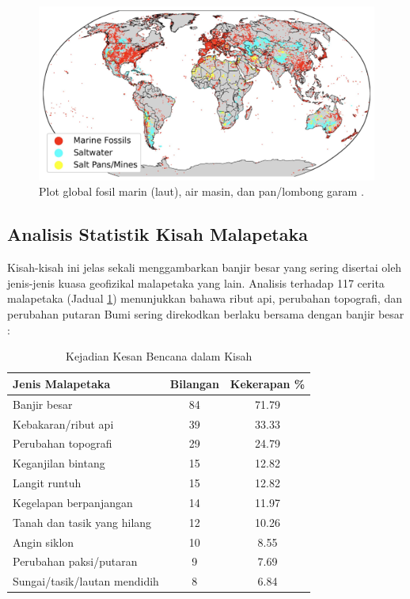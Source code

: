 \documentclass[10pt,twocolumn,letterpaper]{article}
\begin{document}
\begin{figure}[b]
\begin{center}
\includegraphics[width=1\textwidth]{marine.jpg}
\end{center}
   \caption{Plot global fosil marin (laut), air masin, dan pan/lombong garam \cite{15,16,86,87}.}
   \label{fig:2}
\end{figure}

\subsection{Analisis Statistik Kisah Malapetaka}

Kisah-kisah ini jelas sekali menggambarkan banjir besar yang sering disertai oleh jenis-jenis kuasa geofizikal malapetaka yang lain. Analisis terhadap 117 cerita malapetaka (Jadual \ref{tab: 1}) menunjukkan bahawa ribut api, perubahan topografi, dan perubahan putaran Bumi sering direkodkan berlaku bersama dengan banjir besar \cite{14}:

\begin{table}[ht]
\begin{center}
\renewcommand{\arraystretch}{1.2}  %
\begin{tabular}{|l|c|c|}
\hline
\textbf{Jenis Malapetaka} & \textbf{Bilangan} & \textbf{Kekerapan \%} \\
\hline\hline
Banjir besar              & 84 & 71.79 \\
Kebakaran/ribut api       & 39 & 33.33 \\
Perubahan topografi       & 29 & 24.79 \\
Keganjilan bintang     & 15 & 12.82 \\
Langit runtuh           & 15 & 12.82 \\
Kegelapan berpanjangan      & 14 & 11.97 \\
Tanah dan tasik yang hilang    & 12 & 10.26 \\
Angin siklon          & 10 & 8.55  \\
Perubahan paksi/putaran & 9 & 7.69  \\
Sungai/tasik/lautan mendidih & 8 & 6.84 \\
\hline
\end{tabular}
\end{center}
\caption{Kejadian Kesan Bencana dalam Kisah}
\label{tab: 1}
\end{table}
\end{document}
